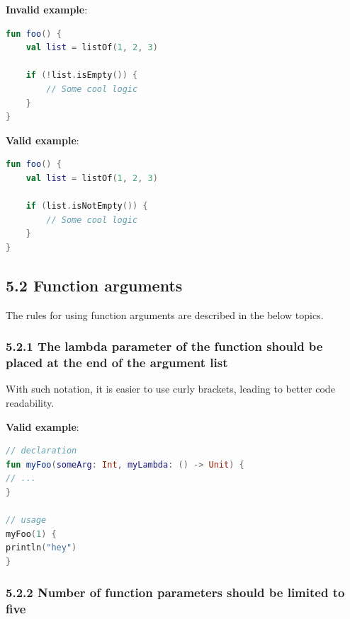 \textbf{Invalid example}:

\begin{lstlisting}[language=Kotlin]
fun foo() { 
    val list = listOf(1, 2, 3)
  
    if (!list.isEmpty()) {
        // Some cool logic
    }
} 
\end{lstlisting}


\textbf{Valid example}:

\begin{lstlisting}[language=Kotlin]
fun foo() { 
    val list = listOf(1, 2, 3)
  
    if (list.isNotEmpty()) {
        // Some cool logic
    }
} 
\end{lstlisting}


\subsection*{\textbf{5.2 Function arguments}}

\label{sec:5.2}

The rules for using function arguments are described in the below topics.

\subsubsection*{\textbf{5.2.1 The lambda parameter of the function should be placed at the end of the argument list}}
\leavevmode\newline

\label{sec:5.2.1}



With such notation, it is easier to use curly brackets, leading to better code readability.



\textbf{Valid example}:

\begin{lstlisting}[language=Kotlin]
// declaration
fun myFoo(someArg: Int, myLambda: () -> Unit) {
// ...
}

// usage
myFoo(1) { 
println("hey")
}
\end{lstlisting}


\subsubsection*{\textbf{5.2.2 Number of function parameters should be limited to five}}
\leavevmode\newline

\label{sec:5.2.2}



